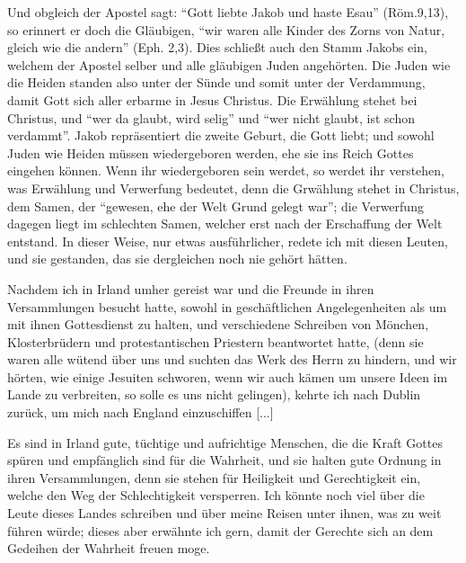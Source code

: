 Und obgleich der Apostel sagt: "`Gott liebte Jakob und haste
Esau"' (Röm.9,13), so erinnert er 
doch die Gläubigen, "`wir waren alle Kinder des Zorns von 
Natur, gleich wie die andern"' (Eph. 2,3).
Dies schließt auch den Stamm Jakobs ein, welchem der Apostel
selber und alle gläubigen Juden angehörten. Die Juden wie die
Heiden standen also unter der Sünde und somit 
unter der Verdammung, damit Gott sich aller erbarme in Jesus Christus.
Die Erwählung stehet bei Christus, und "`wer da glaubt, wird
selig"' und "`wer nicht glaubt, ist schon verdammt"'. Jakob 
repräsentiert die zweite Geburt, die Gott liebt; und sowohl Juden
wie Heiden müssen wiedergeboren werden, 
ehe sie ins Reich Gottes eingehen können. Wenn ihr wiedergeboren 
sein werdet, so werdet
ihr verstehen, was Erwählung und Verwerfung bedeutet, denn
die Grwählung stehet in Christus, dem Samen, der "`gewesen,
ehe der Welt Grund gelegt war"'; die Verwerfung dagegen liegt
im schlechten Samen, welcher erst nach der Erschaffung der Welt
entstand. In dieser Weise, nur etwas ausführlicher, redete ich
mit diesen Leuten, und sie gestanden, das sie dergleichen noch
nie gehört hätten.

Nachdem ich in Irland umher gereist war und die Freunde
in ihren Versammlungen besucht hatte, sowohl in geschäftlichen
Angelegenheiten als um mit ihnen Gottesdienst zu halten, und
verschiedene Schreiben von Mönchen, Klosterbrüdern und 
protestantischen Priestern beantwortet hatte, 
(denn sie waren alle wütend über uns und suchten das Werk des Herrn zu hindern,
und wir hörten, wie einige Jesuiten schworen, wenn wir auch
kämen um unsere Ideen im Lande zu verbreiten, so solle es uns
nicht gelingen), kehrte ich nach Dublin zurück, um mich nach England
einzuschiffen [...]

Es sind in Irland gute, tüchtige und aufrichtige Menschen,
die die Kraft Gottes spüren und empfänglich sind für die 
Wahrheit, und sie halten gute Ordnung in ihren Versammlungen,
denn sie stehen für Heiligkeit und Gerechtigkeit ein, welche den
Weg der Schlechtigkeit versperren. Ich könnte noch viel über
die Leute dieses Landes schreiben und über meine Reisen unter
ihnen, was zu weit führen würde; dieses aber erwähnte ich gern,
damit der Gerechte sich an dem Gedeihen der Wahrheit freuen
moge.

